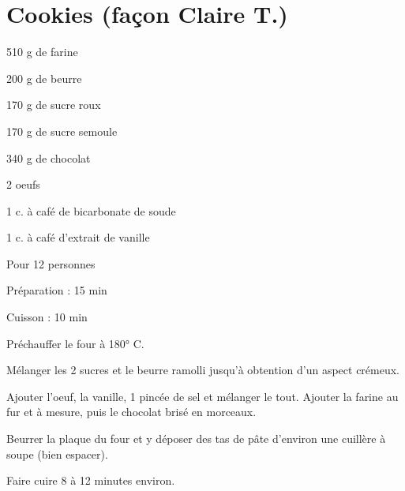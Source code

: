 \section[\normalsize{Cookies (façon Claire T.)}]{Cookies (façon Claire T.)}
\begin{ingredients}
\item 510 g de farine
\item 200 g de beurre
\item 170 g de sucre roux
\item 170 g de sucre semoule
\item 340 g de chocolat
\item 2 oeufs
\item 1 c. \`a caf\'e de bicarbonate de soude
\item 1 c. \`a caf\'e d'extrait de vanille
\end{ingredients}
\begin{infos}
\item Pour 12 personnes
\item Préparation : 15 min
\item Cuisson : 10 min
\end{infos}
\begin{etapes}
\item Pr\'echauffer le four \`a 180° C.
\item M\'elanger les 2 sucres et le beurre ramolli jusqu'\`a 
obtention d'un aspect cr\'emeux.
\item Ajouter l'oeuf, la vanille, 1 pinc\'ee de sel et m\'elanger 
le tout. Ajouter la farine au fur et \`a mesure, puis le chocolat 
bris\'e en morceaux.
\item Beurrer la plaque du four et y d\'eposer des tas de p\^ate 
d'environ une cuill\`ere \`a soupe (bien espacer).
\item Faire cuire 8 \`a 12 minutes environ.
\end{etapes}
\begin{conseils}
\end{conseils}
